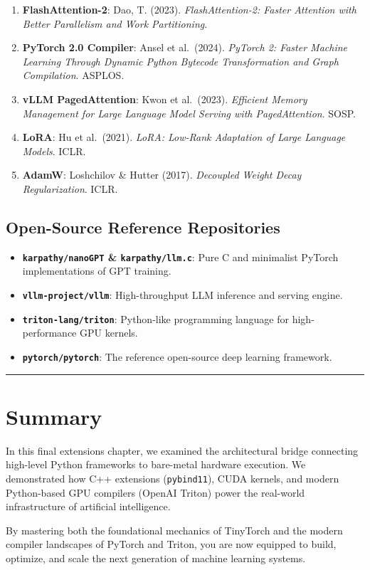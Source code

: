 \documentclass[
  letterpaper,
]{scrbook}
\providecommand{\tightlist}{%
  \setlength{\itemsep}{0pt}\setlength{\parskip}{0pt}}
\begin{document}
\begin{enumerate}
\def\labelenumi{\arabic{enumi}.}
\tightlist
\item
  \textbf{FlashAttention-2}: Dao, T. (2023). \emph{FlashAttention-2:
  Faster Attention with Better Parallelism and Work Partitioning}.
\item
  \textbf{PyTorch 2.0 Compiler}: Ansel et al.~(2024). \emph{PyTorch 2:
  Faster Machine Learning Through Dynamic Python Bytecode Transformation
  and Graph Compilation}. ASPLOS.
\item
  \textbf{vLLM PagedAttention}: Kwon et al.~(2023). \emph{Efficient
  Memory Management for Large Language Model Serving with
  PagedAttention}. SOSP.
\item
  \textbf{LoRA}: Hu et al.~(2021). \emph{LoRA: Low-Rank Adaptation of
  Large Language Models}. ICLR.
\item
  \textbf{AdamW}: Loshchilov \& Hutter (2017). \emph{Decoupled Weight
  Decay Regularization}. ICLR.
\end{enumerate}

\subsection{Open-Source Reference
Repositories}\label{open-source-reference-repositories}

\begin{itemize}
\tightlist
\item
  \textbf{\texttt{karpathy/nanoGPT} \& \texttt{karpathy/llm.c}}: Pure C
  and minimalist PyTorch implementations of GPT training.
\item
  \textbf{\texttt{vllm-project/vllm}}: High-throughput LLM inference and
  serving engine.
\item
  \textbf{\texttt{triton-lang/triton}}: Python-like programming language
  for high-performance GPU kernels.
\item
  \textbf{\texttt{pytorch/pytorch}}: The reference open-source deep
  learning framework.
\end{itemize}

\begin{center}\rule{0.5\linewidth}{0.5pt}\end{center}

\section{Summary}\label{summary-21}

In this final extensions chapter, we examined the architectural bridge
connecting high-level Python frameworks to bare-metal hardware
execution. We demonstrated how C++ extensions (\texttt{pybind11}), CUDA
kernels, and modern Python-based GPU compilers (OpenAI Triton) power the
real-world infrastructure of artificial intelligence.

By mastering both the foundational mechanics of TinyTorch and the modern
compiler landscapes of PyTorch and Triton, you are now equipped to
build, optimize, and scale the next generation of machine learning
systems.


\backmatter
\end{document}

